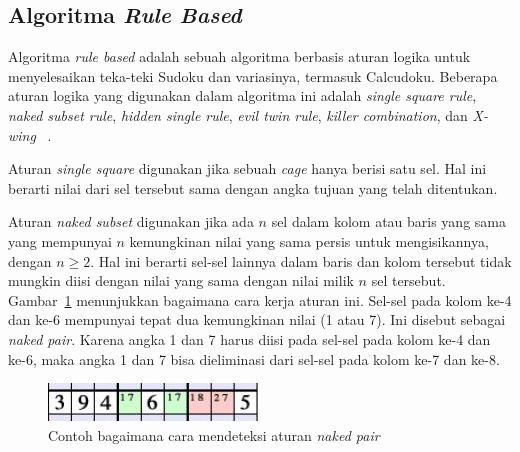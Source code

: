 \subsection{Algoritma \textit{Rule Based}}
\label{sec:rulebased}

Algoritma \textit{rule based} adalah sebuah algoritma berbasis aturan logika untuk menyelesaikan teka-teki Sudoku dan variasinya, termasuk Calcudoku. Beberapa aturan logika yang digunakan dalam algoritma ini adalah \textit{single square rule}, \textit{naked subset rule}, \textit{hidden single rule}, \textit{evil twin rule}, \textit{killer combination}, dan \textit{X-wing} ~\cite{johanna:12:hybrid}.

Aturan \textit{single square} digunakan jika sebuah \textit{cage} hanya berisi satu sel. Hal ini berarti nilai dari sel tersebut sama dengan angka tujuan yang telah ditentukan.

Aturan \textit{naked subset} digunakan jika ada \begin{math}n\end{math} sel dalam kolom atau baris yang sama yang mempunyai \begin{math}n\end{math} kemungkinan nilai yang sama persis untuk mengisikannya, dengan \begin{math}n \geq 2 \end{math}. Hal ini berarti sel-sel lainnya dalam baris dan kolom tersebut tidak mungkin diisi dengan nilai yang sama dengan nilai milik \begin{math}n\end{math} sel tersebut. Gambar~\ref{fig:hybrid2} menunjukkan bagaimana cara kerja aturan ini. Sel-sel pada kolom ke-4 dan ke-6 mempunyai tepat dua kemungkinan nilai (1 atau 7). Ini disebut sebagai \textit{naked pair}. Karena angka 1 dan 7 harus diisi pada sel-sel pada kolom ke-4 dan ke-6, maka angka 1 dan 7 bisa dieliminasi dari sel-sel pada kolom ke-7 dan ke-8.

\begin{figure}
\centering
\captionsetup{justification=centering}
\includegraphics[scale=1]{Gambar/HybridGenetic2}
\caption[Contoh bagaimana cara mendeteksi aturan \textit{naked pair} ~\cite{johanna:12:hybrid}]{Contoh bagaimana cara mendeteksi aturan \textit{naked pair} ~\cite{johanna:12:hybrid}}
\label{fig:hybrid2}
\end{figure}

